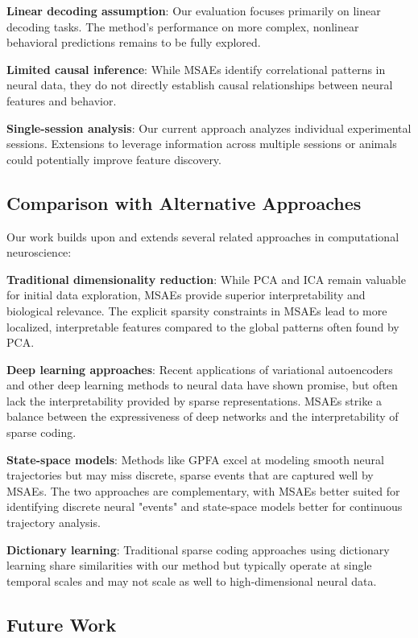 \textbf{Linear decoding assumption}: Our evaluation focuses primarily on linear decoding tasks. The method's performance on more complex, nonlinear behavioral predictions remains to be fully explored.

\textbf{Limited causal inference}: While MSAEs identify correlational patterns in neural data, they do not directly establish causal relationships between neural features and behavior.

\textbf{Single-session analysis}: Our current approach analyzes individual experimental sessions. Extensions to leverage information across multiple sessions or animals could potentially improve feature discovery.

\subsection{Comparison with Alternative Approaches}

Our work builds upon and extends several related approaches in computational neuroscience:

\textbf{Traditional dimensionality reduction}: While PCA and ICA remain valuable for initial data exploration, MSAEs provide superior interpretability and biological relevance. The explicit sparsity constraints in MSAEs lead to more localized, interpretable features compared to the global patterns often found by PCA.

\textbf{Deep learning approaches}: Recent applications of variational autoencoders and other deep learning methods to neural data have shown promise, but often lack the interpretability provided by sparse representations. MSAEs strike a balance between the expressiveness of deep networks and the interpretability of sparse coding.

\textbf{State-space models}: Methods like GPFA excel at modeling smooth neural trajectories but may miss discrete, sparse events that are captured well by MSAEs. The two approaches are complementary, with MSAEs better suited for identifying discrete neural "events" and state-space models better for continuous trajectory analysis.

\textbf{Dictionary learning}: Traditional sparse coding approaches using dictionary learning share similarities with our method but typically operate at single temporal scales and may not scale as well to high-dimensional neural data.

\subsection{Future Work}

